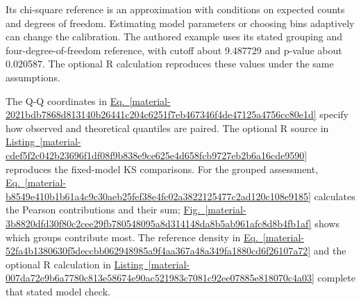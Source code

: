 \documentclass[11pt,a4paper]{article}
\begin{document}
\medskip

Its chi-square reference is an approximation with conditions on expected counts and degrees of freedom. Estimating model parameters or choosing bins adaptively can change the calibration. The authored example uses its stated grouping and four-degree-of-freedom reference, with cutoff about 9.487729 and p-value about 0.020587. The optional R calculation reproduces these values under the same assumptions.


The Q-Q coordinates in \hyperref[material-2021bdb7868d813140b26441c204c6251f7eb467346f4de47125a4756cc80e1d]{Eq.~\ref*{material-2021bdb7868d813140b26441c204c6251f7eb467346f4de47125a4756cc80e1d}} specify how observed and theoretical quantiles are paired. The optional R source in \hyperref[material-cdef5f2c042b23696f1df08f9b838e9ce625e4d658fcb9727eb2b6a16cde9590]{Listing~\ref*{material-cdef5f2c042b23696f1df08f9b838e9ce625e4d658fcb9727eb2b6a16cde9590}} reproduces the fixed-model KS comparisons. For the grouped assessment, \hyperref[material-b8549e410b1b61a4c9c30aeb25fef38e4fc02a3822125477c2ad120c108e9185]{Eq.~\ref*{material-b8549e410b1b61a4c9c30aeb25fef38e4fc02a3822125477c2ad120c108e9185}} calculates the Pearson contributions and their sum; \hyperref[material-3b8820dfd30f80c2cee29fb780548095a8d314148da8b5ab961afc8d8b4fb1af]{Fig.~\ref*{material-3b8820dfd30f80c2cee29fb780548095a8d314148da8b5ab961afc8d8b4fb1af}} shows which groups contribute most. The reference density in \hyperref[material-52fa4b1380630f5deccbb062948985a9f4aa367a48a349fa1880cd6f26107a72]{Eq.~\ref*{material-52fa4b1380630f5deccbb062948985a9f4aa367a48a349fa1880cd6f26107a72}} and the optional R calculation in \hyperref[material-007da72e9b6a7780c813e58674e90ac521983c7081c92ee07885e818070c4a03]{Listing~\ref*{material-007da72e9b6a7780c813e58674e90ac521983c7081c92ee07885e818070c4a03}} complete that stated model check.
\end{document}
